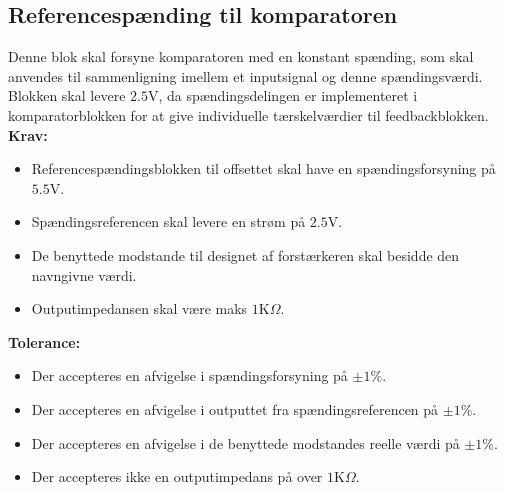 \subsection{Referencespænding til komparatoren}\label{Ref_Kompar_Afs}
Denne blok skal forsyne komparatoren med en konstant spænding, som skal anvendes til sammenligning imellem et inputsignal og denne spændingsværdi.
Blokken skal levere $2.5$V, da spændingsdelingen er implementeret i komparatorblokken for at give individuelle tærskelværdier til feedbackblokken. \\ \textbf{Krav:}
\begin{itemize}
	\item Referencespændingsblokken til offsettet skal have en spændingsforsyning på $5.5$V.
	\item Spændingsreferencen skal levere en strøm på $2.5$V.
	\item De benyttede modstande til designet af forstærkeren skal besidde den navngivne værdi.
	\item Outputimpedansen skal være maks $1$K$\Omega$.
\end{itemize}
\noindent \textbf{Tolerance:}
\begin{itemize}
	\item Der accepteres en afvigelse i spændingsforsyning på $\pm1\%$.
	\item Der accepteres en afvigelse i outputtet fra spændingsreferencen på $\pm1\%$. 
	\item Der accepteres en afvigelse i de benyttede modstandes reelle værdi på $\pm1\%$.
	\item Der accepteres ikke en outputimpedans på over $1$K$\Omega$.
\end{itemize}
